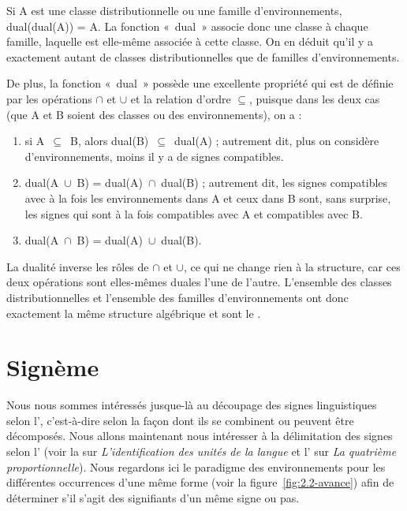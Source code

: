 {    Si A est une classe distributionnelle ou une famille d’environnements, dual(dual(A)) = A. La fonction «~dual~» associe donc une classe à chaque famille, laquelle est elle-même associée à cette classe. On en déduit qu’il y a exactement autant de classes distributionnelles que de familles d’environnements.

    De plus, la fonction «~dual~» possède une excellente propriété qui est de  définie par les opérations \textrm{${\cap}$} et \textrm{${\cup}$} et la relation d’ordre \textrm{${\subseteq}$}, puisque dans les deux cas (que A et B soient des classes ou des environnements), on a :

    \begin{enumerate}
    \item  si A~\textrm{${\subseteq}$}~B, alors dual(B)~\textrm{${\subseteq}$}~dual(A) ; autrement dit, plus on considère d’environnements, moins il y a de signes compatibles.
    \item  dual(A~\textrm{${\cup}$}~B) = dual(A)~\textrm{${\cap}$}~dual(B) ; autrement dit, les signes compatibles avec à la fois les environnements dans A et ceux dans B sont, sans surprise, les signes qui sont à la fois compatibles avec A et compatibles avec B.
    \item dual(A~\textrm{${\cap}$}~B) = dual(A)~\textrm{${\cup}$}~dual(B).
    \end{enumerate}

    La dualité inverse les rôles de \textrm{${\cap}$} et \textrm{${\cup}$}, ce qui ne change rien à la structure, car ces deux opérations sont elles-mêmes duales l’une de l’autre. L’ensemble des classes distributionnelles et l’ensemble des familles d'environnements ont donc exactement la même structure algébrique et sont le  .
}
\section{Signème}\label{sec:2.2.9}%

Nous nous sommes intéressés jusque-là au découpage des signes linguistiques selon l’, c’est-à-dire selon la façon dont ils se combinent ou peuvent être décomposés. Nous allons maintenant nous intéresser à la délimitation des signes selon l’ (voir la  sur \textit{L’identification des unités de la langue} et l’ sur \textit{La quatrième proportionnelle}). Nous regardons ici le paradigme des environnements pour les différentes occurrences d’une même forme (voir la figure~\ref{fig:2.2-avance}) afin de déterminer s’il s’agit des signifiants d’un même signe ou pas.



